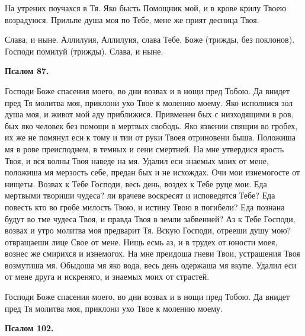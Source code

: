 На утрених поучахся в Тя. Яко бысть Помощник мой, и в крове крилу Твоею возрадуюся. Прильпе душа моя по Тебе, мене же прият десница Твоя. 

Слава, и ныне. Аллилуия, Аллилуия, слава Тебе, Боже (трижды, без поклонов). Господи помилуй (трижды). Слава, и ныне.


\medskip


\bfseries Псалом 87.\normalfont{}\nopagebreak


Господи Боже спасения моего, во дни возвах и в нощи пред Тобою. Да внидет пред Тя молитва моя, приклони ухо Твое к молению моему. Яко исполнися зол душа моя, и живот мой аду приближися. Привменен бых с низходящими в ров, бых яко человек без помощи в мертвых свободь. Яко язвении спящии во гробех, их же не помянул еси к тому и тии от руки Твоея отриновени быша. Положиша мя в рове преисподнем, в темных и сени смертней. На мне утвердися ярость Твоя, и вся волны Твоя наведе на мя. Удалил еси знаемых моих от мене, положиша мя мерзость себе, предан бых и не исхождах. Очи мои изнемогосте от нищеты. Возвах к Тебе Господи, весь день, воздех к Тебе руце мои. Еда мертвыми твориши чудеса? ли врачеве воскресят и исповедятся Тебе? Еда повесть кто во гробе милость Твою, и истину Твою в погибели? Еда познана будут во тме чудеса Твоя, и правда Твоя в земли забвенней? Аз к Тебе Господи, возвах и утро молитва моя предварит Тя. Вскую Господи, отрееши душу мою? отвращаеши лице Свое от мене. Нищь есмь аз, и в трудех от юности моея, вознес же смирихся и изнемогох. На мне преидоша гневи Твои, устрашения Твоя возмутиша мя. Обыдоша мя яко вода, весь день одержаша мя вкупе. Удалил еси от мене друга и искреняго, и знаемых моих от страстей.

Господи Боже спасения моего, во дни возвах и в нощи пред Тобою. Да внидет пред Тя молитва моя, приклони ухо Твое к молению моему.


\medskip


\bfseries Псалом 102.\normalfont{}\nopagebreak


